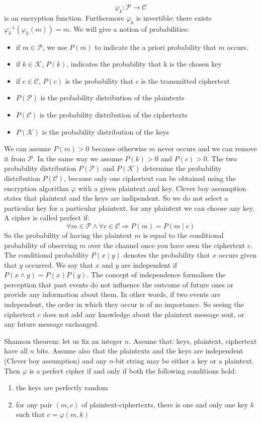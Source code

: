 \[\varphi_k : \mathcal{P} \rightarrow \mathcal{C}\] is an encryption function.
Furthermore $\varphi_k$ is invertible: there exists $\varphi_k ^{-1}(\varphi_k(m)) = m$.
We will give a notion of probabilities:
\begin{itemize}
	\item if $m \in \mathcal{P}$, we use $P(m)$ to indicate the a priori probability that $m$ occurs.
	\item if $k \in \mathcal{K}$, $P(k)$, indicates the probability that k is the chosen key
	\item if $c \in \mathcal{C}$, $P(c)$ is the probability that $c$ is the transmitted ciphertext
	\item $P(\mathcal{P})$ is the probability distribution of the plaintexts
	\item $P(\mathcal{C})$ is the probability distribution of the ciphertexts
	\item $P(\mathcal{K})$ is the probability distribution of the keys
\end{itemize}
We can assume $P(m) > 0$ because otherwise $m$ never occurs and we can remove it from $\mathcal{P}$. In the same way we assume $P(k) > 0$ and $P(c) > 0$. The two probability distribution $P(\mathcal{P})$ and $P(\mathcal{K})$ determine the
probability distribution $P(\mathcal{C})$, because only one ciphertext can be obtained using the encryption algorithm $\varphi$ with a given plaintext and key.
Clever boy assumption states that plaintext and the keys are indipendent. So we do not select a particular key for a particular plaintext, for any plaintext we can choose any key. A cipher is called perfect if:
\[\forall m \in\mathcal{P} \land \forall c \in\mathcal{C} \Longrightarrow P(m) = P(m \mid c) \]
So the probability of having the plaintext $m$ is equal to the conditional probability of observing $m$ over the channel once you have seen the ciphertext $c$. The conditional probability $P(x \mid y)$ denotes the probability that $x$ occurs given that $y$ occurred. We say that $x$ and $y$ are independent if $P(x \land y) = P(x)P(y)$. The concept of independence formalises the perception that past events do not influence the outcome of future ones or provide any information about them. In other words, if two events are independent, the order in which they occur is of no importance. So seeing the ciphertext $c$ does not add any knowledge about the plaintext message sent, or any future message exchanged.

Shannon theorem: let us fix an integer $n$. Assume that: keys, plaintext, ciphertext have all $n$ bits. Assume also that the plaintexts and the keys are independent (Clever boy assumption) and any $n$-bit string may be either a key or a plaintext. Then $\varphi$ is a perfect cipher if and only if both the following conditions hold:
\begin{enumerate}
	\item the keys are perfectly random
	\item for any pair $(m,c)$ of plaintext-ciphertexts, there is one and only one key $k$ such that $c = \varphi(m,k)$
\end{enumerate}

